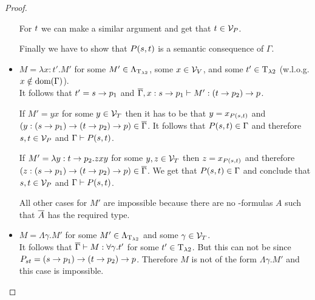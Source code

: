\begin{proof}
\begin{itemize}
		For $\predTSnd$ we can make a similar argument and get that $\predTSnd\in\VarP$.
		
		Finally we have to show that $P(\predTFst,\predTSnd)$ is a semantic consequence of $\Gamma$.
		
		\begin{figure}[H]
			\centering
			
		\end{figure}
		
	\item[] \underline{$M=\lambda x:t'.M'$} for some $M'\in\Lambda_{\text{T}_{\lambda2}}$, some $x\in\mathcal{V}_V$, and some $t'\in\text{T}_{\lambda2}$ (w.l.o.g. $x\notin\text{dom}(\Gamma)$).\\
		It follows that $t'=\predTFst\to p_1$ and $\trans{\Gamma},x:\predTFst\to p_1\lambdaModels M':(\predTSnd\to p_2)\to p$.
		
		If $M'=yx$ for some $y\in\mathcal{V}_T$ then it has to be that $y=x_{P(\predTFst,\predTSnd)}$ and $(y:(\predTFst\to p_1)\to(\predTSnd\to p_2)\to p)\in\trans{\Gamma}$. It follows that $P(\predTFst,\predTSnd)\in\Gamma$ and therefore $\predTFst,\predTSnd\in\VarP$ and $\Gamma\PModels P(\predTFst,\predTSnd)$.
		
		If $M'=\lambda y:\predTSnd\to p_2.zxy$ for some $y,z\in\mathcal{V}_T$ then $z=x_{P(\predTFst,\predTSnd)}$ and therefore $(z:(\predTFst\to p_1)\to(\predTSnd\to p_2)\to p)\in\trans{\Gamma}$. We get that $P(\predTFst,\predTSnd)\in\Gamma$ and conclude that $\predTFst,\predTSnd\in\VarP$ and $\Gamma\PModels P(\predTFst,\predTSnd)$.
		
		All other cases for $M'$ are impossible because there are no \SysP-formulas $A$ such that $\overline{A}$ has the required type. 
	\item[] \underline{$M=\Lambda\gamma.M'$} for some $M'\in\Lambda_{\text{T}_{\lambda2}}$ and some $\gamma\in\mathcal{V}_T$.\\ %
		It follows that $\overline{\Gamma}\vdash M:\forall\gamma.t'$ for some $t'\in\text{T}_{\lambda2}$.
		But this can not be since $\code{P}{\predTFst}{\predTSnd}=(\predTFst\to p_1)\to(\predTSnd\to p_2)\to p$. Therefore $M$ is not of the form $\Lambda\gamma.M'$ and this case is impossible.


\end{itemize}
\end{proof}

